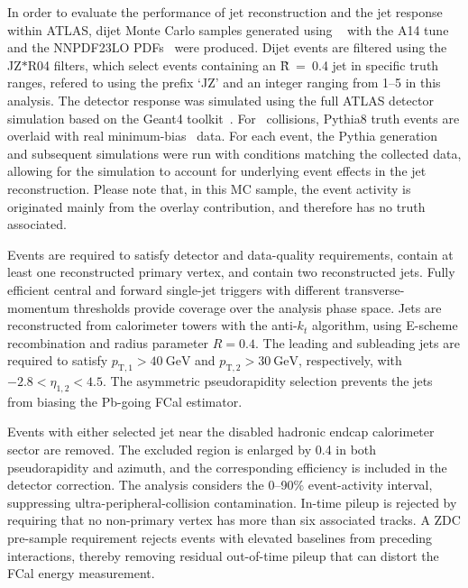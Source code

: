 In order to evaluate the performance of jet reconstruction and the jet response within ATLAS, dijet Monte Carlo samples generated using \pythia~\cite{Bierlich:2022pfr} with the A14 tune and the NNPDF23LO PDFs~\cite{Ball:2012cx} were produced. Dijet events are filtered using the JZ$*$R04 filters, which select events containing an \antikt\~R~=~0.4 jet in specific truth \PT{} ranges, refered to using the prefix `JZ' and an integer ranging from 1--5 in this analysis.
The detector response was simulated using the full ATLAS detector simulation based on the Geant4 toolkit~\cite{Agostinelli:2002hh}. For \pxPb\ collisions, Pythia8 truth events are overlaid with real minimum-bias \pxPb\ data. For each event, the Pythia generation and subsequent simulations were run with conditions matching the collected data, allowing for the simulation to account for underlying event effects in the jet reconstruction. Please note that, in this MC sample, the event activity is originated mainly from the overlay contribution, and therefore has no truth associated.





Events are required to satisfy detector and data-quality requirements, contain
at least one reconstructed primary vertex, and contain two reconstructed jets.
Fully efficient central and forward single-jet triggers with different
transverse-momentum thresholds provide coverage over the analysis phase space.
Jets are reconstructed from calorimeter towers with the anti-$k_t$ algorithm,
using E-scheme recombination and radius parameter $R=0.4$. The leading and
subleading jets are required to satisfy $p_{\mathrm{T},1}>40~\mathrm{GeV}$ and
$p_{\mathrm{T},2}>30~\mathrm{GeV}$, respectively, with
$-2.8<\eta_{1,2}<4.5$. The asymmetric pseudorapidity selection prevents the
jets from biasing the Pb-going FCal estimator.

Events with either selected jet near the disabled hadronic endcap calorimeter
sector are removed. The excluded region is enlarged by 0.4 in both
pseudorapidity and azimuth, and the corresponding efficiency is included in
the detector correction. The analysis considers the 0--90\% event-activity
interval, suppressing ultra-peripheral-collision contamination. In-time pileup
is rejected by requiring that no non-primary vertex has more than six associated
tracks. A ZDC pre-sample requirement rejects events with elevated baselines
from preceding interactions, thereby removing residual out-of-time pileup that
can distort the FCal energy measurement.


